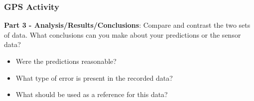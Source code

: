 \documentclass[fleqn]{beamer} %
\newcommand{\sectionIsubsectionIVtitle}{GPS Activity}
\begin{document}
			\begin{frame}
				\frametitle{\sectionIsubsectionIVtitle}

				\scriptsize
				{\bf Part 3 - Analysis/Results/Conclusions}: Compare and contrast the two sets of data. What conclusions can you make about your predictions or the sensor data?
				\begin{multicols}{2}

					\begin{itemize}
						\item Were the predictions reasonable? \\
						\item What type of error is present in the recorded data? \\
						\item What should be used as a reference for this data? \\ 
					\end{itemize}
					

\end{multicols}
\end{frame}
\end{document}
